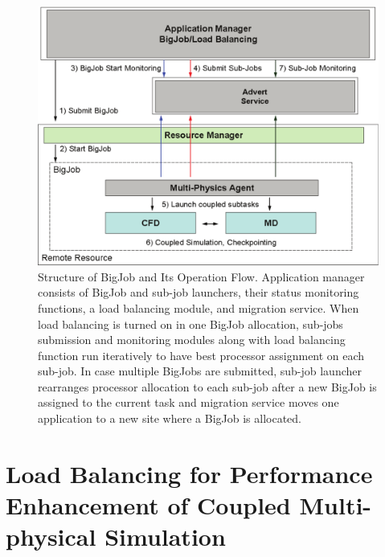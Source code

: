 \documentclass[conference,final]{IEEEtran}
\begin{document}
\begin{figure}
\centering
\includegraphics[scale=0.40]{Structure_of_BigJob}
\caption{\small Structure of BigJob and Its Operation Flow. Application manager consists 
of BigJob and sub-job launchers, their status monitoring functions, a load balancing 
module, and migration service. When load balancing is turned on in one BigJob allocation, 
sub-jobs submission and monitoring modules along with load balancing function run 
iteratively to have best processor assignment on each sub-job. In case multiple BigJobs 
are submitted, sub-job launcher rearranges processor allocation to each sub-job after a 
new BigJob is assigned to the current task and migration service moves one application to 
a new site where a BigJob is allocated.}
\label{Fig:BigJob_Structure}
\end{figure}



\section{Load Balancing for Performance Enhancement of Coupled Multi-physical Simulation}
\end{document}

